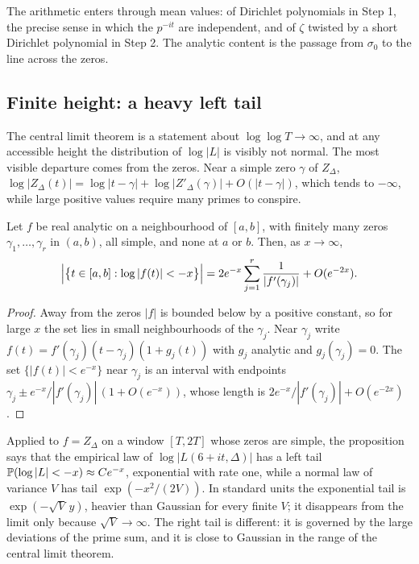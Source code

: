 The arithmetic enters through mean values: of Dirichlet polynomials in Step 1, the precise sense in which the $p^{-it}$ are independent, and of $\zeta$ twisted by a short Dirichlet polynomial in Step 2. The analytic content is the passage from $\sigma_0$ to the line across the zeros.

\subsection{Finite height: a heavy left tail}\label{sec:09btail}

The central limit theorem is a statement about $\log\log T\to\infty$, and at any accessible height the distribution of $\log|L|$ is visibly not normal. The most visible departure comes from the zeros. Near a simple zero $\gamma$ of $Z_\Delta$, $\log|Z_\Delta(t)|=\log|t-\gamma|+\log|Z'_\Delta(\gamma)|+O(|t-\gamma|)$, which tends to $-\infty$, while large positive values require many primes to conspire.

\begin{proposition}\label{prop:09blefttail}
Let $f$ be real analytic on a neighbourhood of $[a,b]$, with finitely many zeros $\gamma_1,\dots,\gamma_r$ in $(a,b)$, all simple, and none at $a$ or $b$. Then, as $x\to\infty$,
\[
\Bigl|\bigl\{t\in[a,b]:\log|f(t)|<-x\bigr\}\Bigr|=2e^{-x}\sum_{j=1}^r\frac{1}{|f'(\gamma_j)|}+O(e^{-2x}).
\]
\end{proposition}

\begin{proof}
Away from the zeros $|f|$ is bounded below by a positive constant, so for large $x$ the set lies in small neighbourhoods of the $\gamma_j$. Near $\gamma_j$ write $f(t)=f'(\gamma_j)(t-\gamma_j)(1+g_j(t))$ with $g_j$ analytic and $g_j(\gamma_j)=0$. The set $\{|f(t)|<e^{-x}\}$ near $\gamma_j$ is an interval with endpoints $\gamma_j\pm e^{-x}/|f'(\gamma_j)|\,(1+O(e^{-x}))$, whose length is $2e^{-x}/|f'(\gamma_j)|+O(e^{-2x})$.
\end{proof}

Applied to $f=Z_\Delta$ on a window $[T,2T]$ whose zeros are simple, the proposition says that the empirical law of $\log|L(6+it,\Delta)|$ has a left tail $\mathbb{P}(\log|L|<-x)\approx Ce^{-x}$, exponential with rate one, while a normal law of variance $V$ has tail $\exp(-x^2/(2V))$. In standard units the exponential tail is $\exp(-\sqrt V\,y)$, heavier than Gaussian for every finite $V$; it disappears from the limit only because $\sqrt V\to\infty$. The right tail is different: it is governed by the large deviations of the prime sum, and it is close to Gaussian in the range of the central limit theorem.

